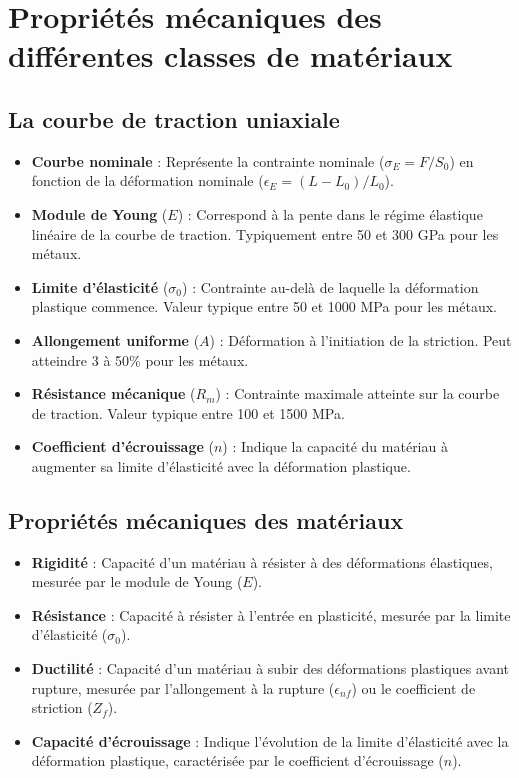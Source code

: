 \documentclass{article}
\begin{document}
\section{Propriétés mécaniques des différentes classes de matériaux}
    \subsection{La courbe de traction uniaxiale}
    
    \begin{itemize}
        \item \textbf{Courbe nominale} : Représente la contrainte nominale ($\sigma_E = F/S_0$) en fonction de la déformation nominale ($\epsilon_E = (L - L_0)/L_0$).
        \item \textbf{Module de Young} ($E$) : Correspond à la pente dans le régime élastique linéaire de la courbe de traction. Typiquement entre 50 et 300 GPa pour les métaux.
        \item \textbf{Limite d'élasticité} ($\sigma_0$) : Contrainte au-delà de laquelle la déformation plastique commence. Valeur typique entre 50 et 1000 MPa pour les métaux.
        \item \textbf{Allongement uniforme} ($A$) : Déformation à l'initiation de la striction. Peut atteindre 3 à 50\% pour les métaux.
        \item \textbf{Résistance mécanique} ($R_m$) : Contrainte maximale atteinte sur la courbe de traction. Valeur typique entre 100 et 1500 MPa.
        \item \textbf{Coefficient d'écrouissage} ($n$) : Indique la capacité du matériau à augmenter sa limite d'élasticité avec la déformation plastique.
    \end{itemize}
    
    \subsection{Propriétés mécaniques des matériaux}
    
    \begin{itemize}
        \item \textbf{Rigidité} : Capacité d'un matériau à résister à des déformations élastiques, mesurée par le module de Young ($E$).
        \item \textbf{Résistance} : Capacité à résister à l'entrée en plasticité, mesurée par la limite d'élasticité ($\sigma_0$).
        \item \textbf{Ductilité} : Capacité d'un matériau à subir des déformations plastiques avant rupture, mesurée par l'allongement à la rupture ($\epsilon_{nf}$) ou le coefficient de striction ($Z_f$).
        \item \textbf{Capacité d'écrouissage} : Indique l'évolution de la limite d'élasticité avec la déformation plastique, caractérisée par le coefficient d'écrouissage ($n$).
    \end{itemize}
    
\end{document}

